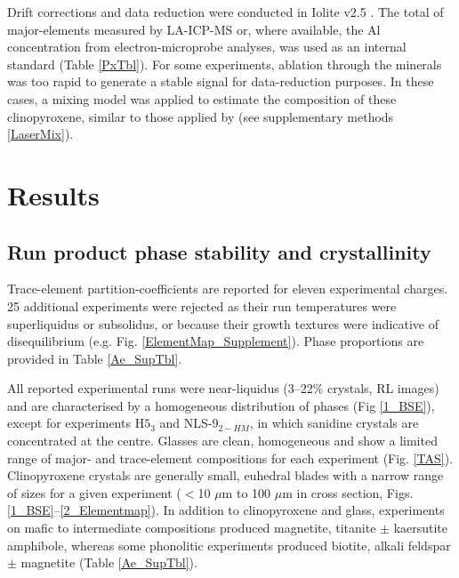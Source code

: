 \documentclass[final,authoryear,3p,times,twocolumn]{elsarticle}
\begin{document}
Drift corrections and data reduction were conducted in Iolite v2.5 \citep{Paton2011}. The total of major-elements measured by LA-ICP-MS or, where available, the Al concentration from electron-microprobe analyses, was used as an internal standard (Table \ref{PxTbl}). For some experiments, ablation through the minerals was too rapid to generate a stable signal for data-reduction purposes. In these cases, a mixing model was applied to estimate the composition of these clinopyroxene, similar to those applied by \citet{Rubatto2007,Yang_InPrep}(see supplementary methods \ref{LaserMix}). %

\section{Results}
\subsection{Run product phase stability and crystallinity}
Trace-element partition-coefficients are reported for eleven experimental charges. 25 additional experiments were rejected as their run temperatures were superliquidus or subsolidus, or because their growth textures were indicative of disequilibrium (e.g. Fig. \ref{ElementMap_Supplement}). Phase proportions are provided in Table \ref{Ae_SupTbl}.

All reported experimental runs were near-liquidus (3--22\% crystals, RL images)
and are characterised by a homogeneous distribution of phases (Fig \ref{1_BSE}), except for experiments H$5_3$ and NLS-$9_{2-HM}$, in which sanidine crystals are concentrated at the centre. Glasses are clean, homogeneous and show a limited range of major- and trace-element compositions for each experiment (Fig. \ref{TAS}). Clinopyroxene crystals are generally small, euhedral blades with a narrow range of sizes for a given experiment ($<$10 $\mu$m to 100 $\mu$m in cross section, Figs. \ref{1_BSE}--\ref{2_Elementmap}). In addition to clinopyroxene and glass, experiments on mafic to intermediate compositions produced magnetite, titanite $\pm$ kaersutite amphibole, whereas some phonolitic experiments produced biotite, alkali feldspar $\pm$ magnetite (Table \ref{Ae_SupTbl}). 
\end{document}
